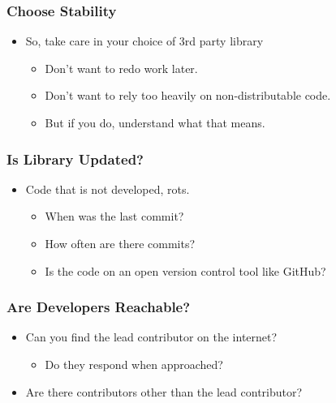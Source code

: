 \subsubsection{Choose Stability}\label{choose-stability}

\begin{itemize}
\itemsep1pt\parskip0pt
\item
  So, take care in your choice of 3rd party library

  \begin{itemize}
  \itemsep1pt\parskip0pt
  \item
    Don't want to redo work later.
  \item
    Don't want to rely too heavily on non-distributable code.
  \item
    But if you do, understand what that means.
  \end{itemize}
\end{itemize}

\subsubsection{Is Library Updated?}\label{is-library-updated}

\begin{itemize}
\itemsep1pt\parskip0pt
\item
  Code that is not developed, rots.

  \begin{itemize}
  \itemsep1pt\parskip0pt
  \item
    When was the last commit?
  \item
    How often are there commits?
  \item
    Is the code on an open version control tool like GitHub?
  \end{itemize}
\end{itemize}

\subsubsection{Are Developers
Reachable?}\label{are-developers-reachable}

\begin{itemize}
\itemsep1pt\parskip0pt
\item
  Can you find the lead contributor on the internet?

  \begin{itemize}
  \itemsep1pt\parskip0pt
  \item
    Do they respond when approached?
  \end{itemize}
\item
  Are there contributors other than the lead contributor?
\end{itemize}

